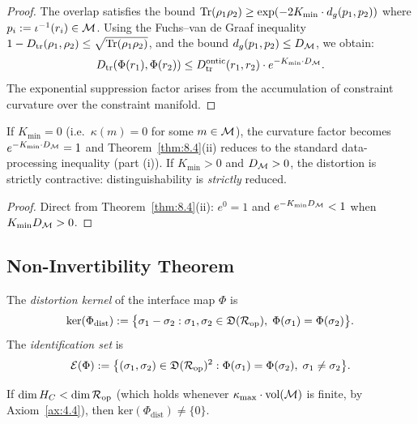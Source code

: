 \begin{proof}
The overlap satisfies the bound
$\mathrm{Tr}(\rho_1 \rho_2) \geq \exp(-2 K_{\min} \cdot d_g(p_1, p_2))$
where $p_i := \iota^{-1}(r_i) \in \mathcal{M}$.  Using the Fuchs--van de
Graaf inequality $1 - D_{\mathrm{tr}}(\rho_1, \rho_2) \leq
\sqrt{\mathrm{Tr}(\rho_1 \rho_2)}$, and the bound $d_g(p_1, p_2) \leq D_{\mathcal{M}}$,
we obtain:
\[
  D_{\mathrm{tr}}(\Phi(r_1), \Phi(r_2))
  \leq D_{\mathrm{tr}}^{\mathrm{ontic}}(r_1, r_2) \cdot
  e^{-K_{\min} \cdot D_{\mathcal{M}}}.
\]
The exponential suppression factor arises from the accumulation of
constraint curvature over the constraint manifold.
\end{proof}

\begin{corollary}
\label{cor:8.2}
If $K_{\min} = 0$ \textup{(}i.e.\ $\kappa(m) = 0$ for some
$m \in \mathcal{M}$\textup{)}, the curvature factor becomes
$e^{-K_{\min} \cdot D_{\mathcal{M}}} = 1$ and Theorem~\textup{\ref{thm:8.4}(ii)}
reduces to the standard data-processing inequality
\textup{(}part (i)\textup{)}.  If $K_{\min} > 0$ and
$D_{\mathcal{M}} > 0$, the distortion is strictly contractive:
distinguishability is \emph{strictly} reduced.
\end{corollary}

\begin{proof}
Direct from Theorem~\ref{thm:8.4}(ii): $e^0 = 1$ and
$e^{-K_{\min} D_{\mathcal{M}}} < 1$ when $K_{\min} D_{\mathcal{M}} > 0$.
\end{proof}

\subsection{Non-Invertibility Theorem}
\label{sec:ch8:noninvert}

\begin{definition}
\label{def:8.11}
The \emph{distortion kernel} of the interface map $\Phi$ is
\[
  \mathrm{ker}(\Phi_{\mathrm{dist}})
  := \bigl\{
    \sigma_1 - \sigma_2 :
    \sigma_1, \sigma_2 \in \mathfrak{D}(\mathcal{R}_{\mathrm{op}}),\;
    \Phi(\sigma_1) = \Phi(\sigma_2)
  \bigr\}.
\]
The \emph{identification set} is
\[
  \mathcal{E}(\Phi) := \bigl\{
    (\sigma_1, \sigma_2) \in
    \mathfrak{D}(\mathcal{R}_{\mathrm{op}})^2 :
    \Phi(\sigma_1) = \Phi(\sigma_2),\;
    \sigma_1 \neq \sigma_2
  \bigr\}.
\]
\end{definition}

\begin{lemma}
\label{lem:8.5}
If $\dim H_C < \dim\mathcal{R}_{\mathrm{op}}$ \textup{(}which holds whenever
$\kappa_{\max} \cdot \mathrm{vol}(\mathcal{M})$ is finite, by
Axiom~\textup{\ref{ax:4.4})}, then
$\mathrm{ker}(\Phi_{\mathrm{dist}}) \neq \{0\}$.
\end{lemma}

